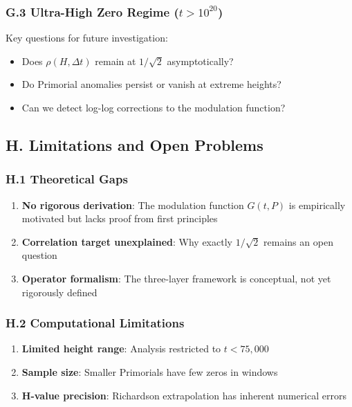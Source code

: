 \documentclass[12pt]{article}
\begin{document}
\subsubsection*{G.3 Ultra-High Zero Regime ($t > 10^{20}$)}

Key questions for future investigation:
\begin{itemize}
\item Does $\rho(H, \Delta t)$ remain at $1/\sqrt{2}$ asymptotically?
\item Do Primorial anomalies persist or vanish at extreme heights?
\item Can we detect log-log corrections to the modulation function?
\end{itemize}

\subsection*{H. Limitations and Open Problems}

\subsubsection*{H.1 Theoretical Gaps}

\begin{enumerate}
\item \textbf{No rigorous derivation}: The modulation function $G(t,P)$ is empirically motivated but lacks proof from first principles
\item \textbf{Correlation target unexplained}: Why exactly $1/\sqrt{2}$ remains an open question
\item \textbf{Operator formalism}: The three-layer framework is conceptual, not yet rigorously defined
\end{enumerate}

\subsubsection*{H.2 Computational Limitations}

\begin{enumerate}
\item \textbf{Limited height range}: Analysis restricted to $t < 75{,}000$
\item \textbf{Sample size}: Smaller Primorials have few zeros in windows
\item \textbf{H-value precision}: Richardson extrapolation has inherent numerical errors
\end{enumerate}
\end{document}

